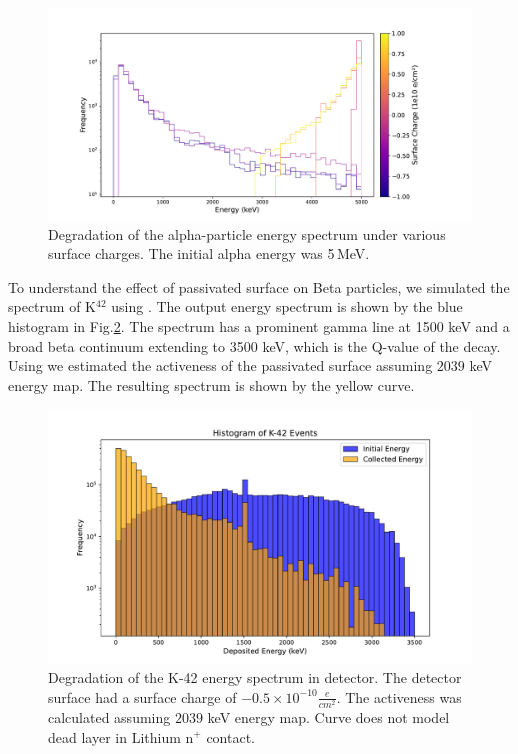 \begin{figure}%
  \centering
  \includegraphics[trim={2cm 0.5cm 4.5cm 1.7cm},clip,width=0.99\linewidth]{ch5/figs/eng_deg_hist.pdf}
  \caption{Degradation of the alpha-particle energy spectrum under various surface charges. The initial alpha energy was 5\,MeV.}
  \label{fig:eng_spec_degradation}
\end{figure}

To understand the effect of passivated surface on Beta particles, we simulated the spectrum of K$^{42}$ using {\geant}. The output energy spectrum is shown by the blue histogram in Fig.\ref{ch5_figs_k_42_degrad}. The spectrum has a prominent gamma line at 1500 keV and a broad beta continuum extending to 3500 keV, which is the Q-value of the decay. Using {\ehd} we estimated the activeness of the passivated surface assuming $2039$ keV energy map. The resulting spectrum is shown by the yellow curve.

\begin{figure}%
  \centering
  \includegraphics[trim={1.5cm 0.0cm 2cm 1.76cm},clip,width=0.99\linewidth]{ch5/figs/k_42_beta_spectrum.pdf}
  \caption{Degradation of the K-42 energy spectrum in {\ponama} detector. The detector surface had a surface charge of $- 0.5 \times 10^{-10} \frac{e}{cm^2}$. The activeness was calculated assuming $2039$ keV energy map. Curve does not model dead layer in Lithium n$^+$ contact.}
  \label{ch5_figs_k_42_degrad}
\end{figure}

